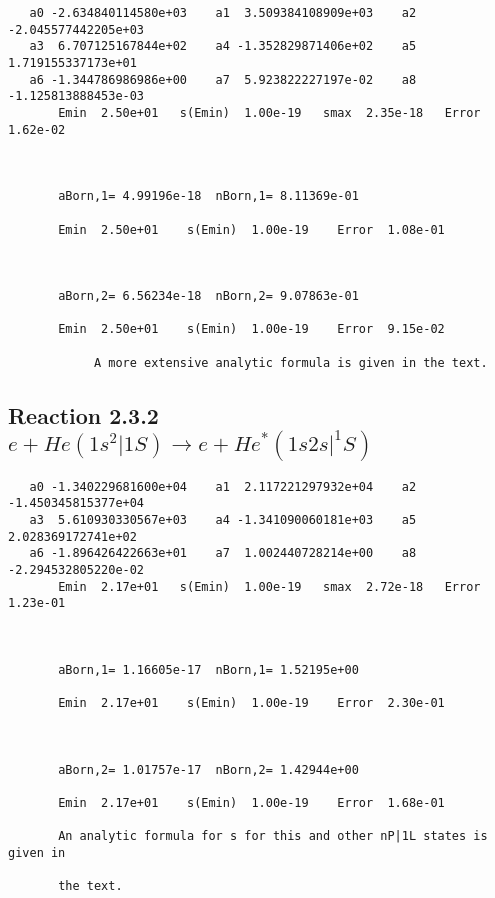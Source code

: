 \documentclass[12pt]{article}
\begin{document}
\begin{small}\begin{verbatim}
   a0 -2.634840114580e+03    a1  3.509384108909e+03    a2 -2.045577442205e+03
   a3  6.707125167844e+02    a4 -1.352829871406e+02    a5  1.719155337173e+01
   a6 -1.344786986986e+00    a7  5.923822227197e-02    a8 -1.125813888453e-03
       Emin  2.50e+01   s(Emin)  1.00e-19   smax  2.35e-18   Error  1.62e-02



       aBorn,1= 4.99196e-18  nBorn,1= 8.11369e-01

       Emin  2.50e+01    s(Emin)  1.00e-19    Error  1.08e-01



       aBorn,2= 6.56234e-18  nBorn,2= 9.07863e-01

       Emin  2.50e+01    s(Emin)  1.00e-19    Error  9.15e-02

            A more extensive analytic formula is given in the text.
\end{verbatim}\end{small}






\newpage
\subsection{
Reaction 2.3.2 $e + He(1s^2|1S) \rightarrow e + He^*(1s2s|^1S)$}

















\begin{small}\begin{verbatim}
   a0 -1.340229681600e+04    a1  2.117221297932e+04    a2 -1.450345815377e+04
   a3  5.610930330567e+03    a4 -1.341090060181e+03    a5  2.028369172741e+02
   a6 -1.896426422663e+01    a7  1.002440728214e+00    a8 -2.294532805220e-02
       Emin  2.17e+01   s(Emin)  1.00e-19   smax  2.72e-18   Error  1.23e-01



       aBorn,1= 1.16605e-17  nBorn,1= 1.52195e+00

       Emin  2.17e+01    s(Emin)  1.00e-19    Error  2.30e-01



       aBorn,2= 1.01757e-17  nBorn,2= 1.42944e+00

       Emin  2.17e+01    s(Emin)  1.00e-19    Error  1.68e-01

       An analytic formula for s for this and other nP|1L states is given in

       the text.
\end{verbatim}\end{small}
\end{document}
